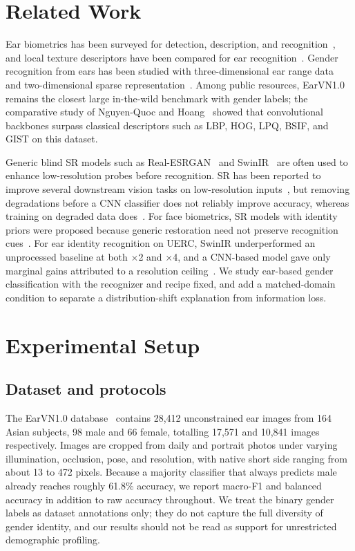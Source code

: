 \documentclass[conference]{IEEEtran}
\begin{document}
\section{Related Work}\label{sec:related}
Ear biometrics has been surveyed for detection, description, and recognition~\cite{emersic2017,pflug2012}, and local texture descriptors have been compared for ear recognition~\cite{hassaballah2019}. Gender recognition from ears has been studied with three-dimensional ear range data~\cite{lei2013} and two-dimensional sparse representation~\cite{khorsandi2013}. Among public resources, EarVN1.0~\cite{hoang2019earvn} remains the closest large in-the-wild benchmark with gender labels; the comparative study of Nguyen-Quoc and Hoang~\cite{nguyenquoc2020} showed that convolutional backbones surpass classical descriptors such as LBP, HOG, LPQ, BSIF, and GIST on this dataset.

Generic blind SR models such as Real-ESRGAN~\cite{realesrgan} and SwinIR~\cite{swinir} are often used to enhance low-resolution probes before recognition. SR has been reported to improve several downstream vision tasks on low-resolution inputs~\cite{dai2016}, but removing degradations before a CNN classifier does not reliably improve accuracy, whereas training on degraded data does~\cite{pei2021}. For face biometrics, SR models with identity priors were proposed because generic restoration need not preserve recognition cues~\cite{grm2020}. For ear identity recognition on UERC, SwinIR underperformed an unprocessed baseline at both $\times$2 and $\times$4, and a CNN-based model gave only marginal gains attributed to a resolution ceiling~\cite{markicevic2023}. We study ear-based gender classification with the recognizer and recipe fixed, and add a matched-domain condition to separate a distribution-shift explanation from information loss.

\section{Experimental Setup}\label{sec:setup}
\subsection{Dataset and protocols}
The EarVN1.0 database~\cite{hoang2019earvn} contains 28{,}412 unconstrained ear images from 164 Asian subjects, 98 male and 66 female, totalling 17{,}571 and 10{,}841 images respectively. Images are cropped from daily and portrait photos under varying illumination, occlusion, pose, and resolution, with native short side ranging from about 13 to 472 pixels. Because a majority classifier that always predicts male already reaches roughly 61.8\% accuracy, we report macro-F1 and balanced accuracy in addition to raw accuracy throughout. We treat the binary gender labels as dataset annotations only; they do not capture the full diversity of gender identity, and our results should not be read as support for unrestricted demographic profiling.
\end{document}
